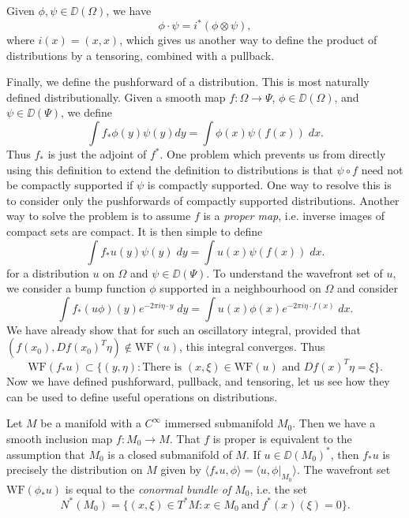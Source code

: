 \begin{example}
    Given $\phi,\psi \in \DD(\Omega)$, we have
    \[ \phi \cdot \psi = i^*(\phi \otimes \psi), \]
    where $i(x) = (x,x)$, which gives us another way to define the product of distributions by a tensoring, combined with a pullback.
\end{example}

Finally, we define the pushforward of a distribution. This is most naturally defined distributionally. Given a smooth map $f: \Omega \to \Psi$, $\phi \in \DD(\Omega)$, and $\psi \in \DD(\Psi)$, we define
%
\[ \int f_* \phi(y) \psi(y) dy = \int \phi(x) \psi(f(x))\; dx. \]
%
Thus $f_*$ is just the adjoint of $f^*$. One problem which prevents us from directly using this definition to extend the definition to distributions is that $\psi \circ f$ need not be compactly supported if $\psi$ is compactly supported. One way to resolve this is to consider only the pushforwards of compactly supported distributions. Another way to solve the problem is to assume $f$ is a \emph{proper map}, i.e. inverse images of compact sets are compact. It is then simple to define
%
\[ \int f_* u(y) \psi(y)\; dy = \int u(x) \psi(f(x))\; dx. \]
%
for a distribution $u$ on $\Omega$ and $\psi \in \DD(\Psi)$. To understand the wavefront set of $u$, we consider a bump function $\phi$ supported in a neighbourhood  on $\Omega$ and consider
%
\[ \int f_*(u \phi)(y) e^{-2 \pi i \eta \cdot y}\; dy = \int u(x) \phi(x) e^{-2 \pi i \eta \cdot f(x)}\; dx. \]
%
We have already show that for such an oscillatory integral, provided that $(f(x_0),Df(x_0)^T \eta) \not \in \text{WF}(u)$, this integral converges. Thus
%
\[ \text{WF}(f_* u) \subset \{ (y,\eta) : \text{There is $(x,\xi) \in \text{WF}(u)$ and $Df(x)^T \eta = \xi$} \}. \]
%
Now we have defined pushforward, pullback, and tensoring, let us see how they can be used to define useful operations on distributions.

\begin{example}
    Let $M$ be a manifold with a $C^\infty$ immersed submanifold $M_0$. Then we have a smooth inclusion map $f: M_0 \to M$. That $f$ is proper is equivalent to the assumption that $M_0$ is a closed submanifold of $M$. If $u \in \DD(M_0)^*$, then $f_* u$ is precisely the distribution on $M$ given by $\langle f_* u, \phi \rangle = \langle u, \phi|_{M_0} \rangle$. The wavefront set $\text{WF}(\phi_* u)$ is equal to the \emph{conormal bundle of $M_0$}, i.e. the set
    \[ N^*(M_0) = \{ (x,\xi) \in T^*M: x \in M_0\ \text{and}\ f^*(x)(\xi) = 0 \}. \]
\end{example}

